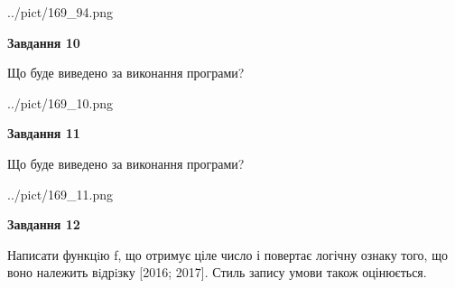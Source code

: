 \documentclass[12pt, ukrainian]{article}
\begin{document}
{\begin {large}
\begin{center}
	{../pict/169_94.png}
\end{center}
\newpage

{\begin {center}\textbf{Завдання 10}\end {center}}

Що буде виведено за виконання програми?\par
\begin{center}
	{../pict/169_10.png}
\end{center}
\newpage

{\begin {center}\textbf{Завдання 11}\end {center}}

Що буде виведено за виконання програми?\par
\begin{center}
	{../pict/169_11.png}
\end{center}
\newpage

{\begin {center}\textbf{Завдання 12}\end {center}}


Написати функцiю f, що отримує ціле число і повертає логічну ознаку того, що воно належить вiдрiзку [2016; 2017]. Стиль запису умови також оцінюється.\par
\newpage

\end {large}}
\end{document}
